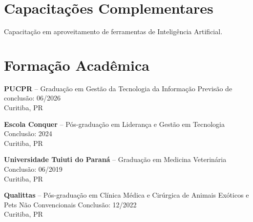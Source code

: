 \documentclass[11pt,a4paper]{article}
\begin{document}
\section*{Capacitações Complementares}

Capacitação em aproveitamento de ferramentas de Inteligência Artificial.

\section*{Formação Acadêmica}

\textbf{PUCPR} -- Graduação em Gestão da Tecnologia da Informação \hfill Previsão de conclusão: 06/2026\\
Curitiba, PR

\textbf{Escola Conquer} -- Pós-graduação em Liderança e Gestão em Tecnologia \hfill Conclusão: 2024\\
Curitiba, PR

\textbf{Universidade Tuiuti do Paraná} -- Graduação em Medicina Veterinária \hfill Conclusão: 06/2019\\
Curitiba, PR

\textbf{Qualittas} -- Pós-graduação em Clínica Médica e Cirúrgica de Animais Exóticos e Pets Não Convencionais \hfill Conclusão: 12/2022\\
Curitiba, PR
\end{document}
